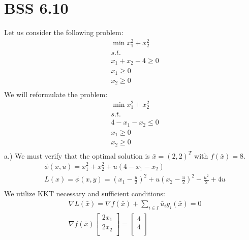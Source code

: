 \documentclass[12pt]{article}
\begin{document}
\section{BSS 6.10}
    Let us consider the following problem: \\
        \begin{align*}
            &\min x_1^2 + x_2^2\\
            &s.t.\\
            &x_1 + x_2 - 4 \geq 0\\
            &x_1 \geq 0\\
            &x_2 \geq 0 \\
        \end{align*}
    We will reformulate the problem:\\
        \begin{align*}
            &\min x_1^2 + x_2^2\\
            &s.t.\\
            &4-x_1-x_2 \leq 0\\
            &x_1 \geq 0\\
            &x_2 \geq 0 \\
        \end{align*}
    a.) We must verify that the optimal solution is $\bar x = (2,2)^T$ with $f(\bar x) = 8$. \\ 
        \begin{align*}
            &\phi (x,u) = x_1^2 + x_2^2 + u (4 - x_1 - x_2)\\
            &L(x) = \phi (x,y) = (x_1 - \frac{u}{2})^2 + u (x_2 - \frac{u}{2})^2 - \frac{u^2}{2} + 4u\\
        \end{align*}
    We utilize KKT necessary and sufficient conditions: \\
        \begin{align*}
            &\nabla L(\bar x) = \nabla f(\bar x) + \sum_{i \in I} \bar u_i g_i (\bar x) = 0\\ 
            &\nabla f(\bar x) 
                \begin{bmatrix}
                    2x_1\\
                    2x_2\\
                \end{bmatrix} = 
                \begin{bmatrix}
                    4\\
                    4\\
                \end{bmatrix}
        \end{align*}
\end{document}

